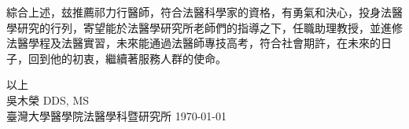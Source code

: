 \documentclass{letter}
\begin{document}
\begin{letter}

綜合上述，玆推薦祁力行醫師，符合法醫科學家的資格，有勇氣和決心，投身法醫學研究的行列，寄望能於法醫學研究所老師們的指導之下，任職助理教授，並進修法醫學程及法醫實習，未來能通過法醫師專技高考，符合社會期許，在未來的日子，回到他的初衷，繼續著服務人群的使命。

\medskip
以上\\
吳木榮 DDS, MS\hspace{3mm}\\
臺灣大學醫學院法醫學科暨研究所 \hspace{5mm} \today


\clearpage

%


\end{letter}
\end{document}
